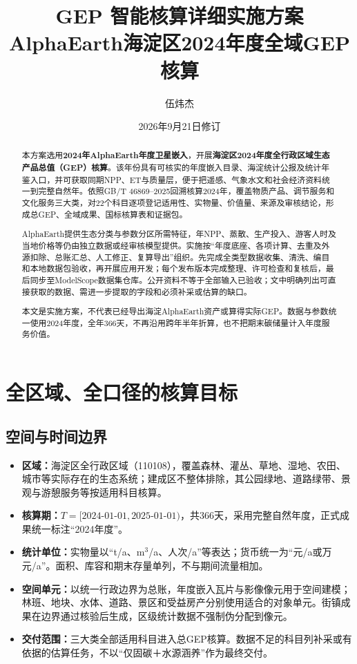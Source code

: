 \documentclass[12pt,a4paper,fontset=fandol]{ctexart}
\title{\textbf{GEP 智能核算详细实施方案}\\[0.5em]\Large AlphaEarth海淀区2024年度全域GEP核算}
\author{伍炜杰}
\date{2026年9月21日修订}
\begin{document}
\maketitle
\thispagestyle{empty}
\begin{abstract}
本方案选用\textbf{2024年AlphaEarth年度卫星嵌入}，开展\textbf{海淀区2024年度全行政区域生态产品总值（GEP）核算}。该年份具有可核实的年度嵌入目录、海淀统计公报及统计年鉴入口，并可获取同期NPP、ET与质量层，便于把遥感、气象水文和社会经济资料统一到完整自然年。依照GB/T 46869--2025回溯核算2024年，覆盖物质产品、调节服务和文化服务三大类，对22个科目逐项登记适用性、实物量、价值量、来源及审核结论，形成总GEP、全域成果、国标核算表和证据包。

AlphaEarth提供生态分类与参数分区所需特征，年NPP、蒸散、生产投入、游客人时及当地价格等仍由独立数据或经审核模型提供。实施按“年度底座、各项计算、去重及外源扣除、总账汇总、人工修正、复算导出”组织。先完成全类型数据收集、清洗、编目和本地数据包验收，再开展应用开发；每个发布版本完成整理、许可检查和复核后，最后同步至ModelScope数据集仓库。公开资料不等于全部输入已验收；文中明确列出可直接获取的数据、需进一步提取的字段和必须补采或估算的缺口。

本文是实施方案，不代表已经导出海淀AlphaEarth资产或算得实际GEP。数据与参数统一使用2024年度，全年366天，不再沿用跨年半年折算，也不把期末碳储量计入年度服务价值。
\end{abstract}
\newpage\tableofcontents\newpage

\section{全区域、全口径的核算目标}
\subsection{空间与时间边界}
\begin{itemize}
\item \textbf{区域：}海淀区全行政区域（110108），覆盖森林、灌丛、草地、湿地、农田、城市等实际存在的生态系统；建成区不整体排除，其公园绿地、道路绿带、景观与游憩服务等按适用科目核算。
\item \textbf{核算期：}$T=[2024\text{-}01\text{-}01,2025\text{-}01\text{-}01)$，共366天，采用完整自然年度，正式成果统一标注“2024年度”。
\item \textbf{统计单位：}实物量以“t/a、m$^3$/a、人次/a”等表达；货币统一为“元/a或万元/a”。面积、库容和期末存量单列，不与期间流量相加。
\item \textbf{空间单元：}以统一行政边界为总账，年度嵌入瓦片与影像像元用于空间建模；林班、地块、水体、道路、景区和受益房产分别使用适合的对象单元。街镇成果在边界通过核验后生成，区级统计数据不强制伪分配到像元。
\item \textbf{交付范围：}三大类全部适用科目进入总GEP核算。数据不足的科目列补采或有依据的估算任务，不以“仅固碳＋水源涵养”作为最终交付。
\end{itemize}
\end{document}
